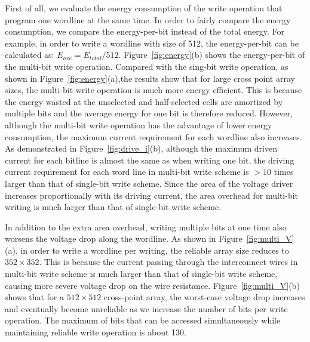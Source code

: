 First of all, we evaluate the energy consumption of the write operation
that program one wordline at the same time. In order to fairly compare the
energy consumption, we compare the energy-per-bit instead of the total
energy. For example, in order to write a wordline with size of 512, the
energy-per-bit can be calculated as: $E_{ave}=E_{total}/512$.
Figure~\ref{fig:energy}(b) shows the energy-per-bit of the multi-bit write
operation. Compared with the sing-bit write operation, as shown in Figure~\ref{fig:energy}(a),the results
show that for large cross point array sizes, the multi-bit write operation
is much more energy efficient. This is because the energy wasted at the
unselected and half-selected cells are amortized by multiple bits and the
average energy for one bit is therefore reduced. However, although the
multi-bit write operation has the advantage of lower energy consumption,
the maximum current requirement for each wordline also increases. As demonstrated
in Figure~\ref{fig:drive_i}(b), although the maximum driven current for each
bitline is almost the same as when writing one bit, the driving
current requirement for each word line in multi-bit write scheme is $>10$ times larger than that of single-bit
write scheme. Since the area of the voltage driver increases proportionally
with its driving current, the area overhead for multi-bit writing is much larger than that of single-bit write scheme.



In addition to the extra area overhead, writing multiple bits at one time also worsens the voltage drop along the wordline. As shown in Figure~\ref{fig:multi_V}(a), in order to write a wordline per writing, the
reliable array size reduces to $352 \times 352$. This is because the current passing through the interconnect wires in multi-bit write scheme is much larger than that of single-bit write scheme, causing more severe voltage drop on the wire resistance. Figure~\ref{fig:multi_V}(b) shows that for a $512\times 512$ cross-point array, the worst-case voltage drop increases and eventually become unreliable as we increase the number of bits per write operation. The maximum of bits that can be accessed simultaneously while maintaining reliable write operation is about 130.

